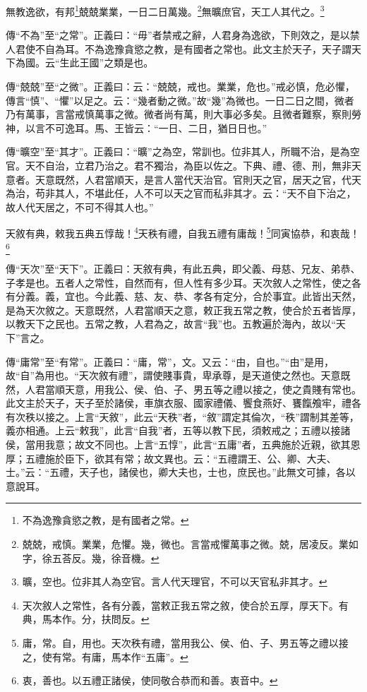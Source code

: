 無教逸欲，有邦\footnote{不為逸豫貪慾之教，是有國者之常。}兢兢業業，一日二日萬幾。\footnote{兢兢，戒慎。業業，危懼。幾，微也。言當戒懼萬事之微。兢，居凌反。業如字，徐五荅反。幾，徐音機。}無曠庶官，天工人其代之。\footnote{曠，空也。位非其人為空官。言人代天理官，不可以天官私非其才。}


{\noindent\zhuan{}\fzbyks 傳“不為”至“之常”。正義曰：“毋”者禁戒之辭，人君身為逸欲，下則效之，是以禁人君使不自為耳。不為逸豫貪慾之教，是有國者之常也。此文主於天子，天子謂天下為國。云“生此王國”之類是也。 \par}

{\noindent\zhuan{}\fzbyks 傳“兢兢”至“之微”。正義曰：云：“兢兢，戒也。業業，危也。”戒必慎，危必懼，傳言“慎”、“懼”以足之。云：“幾者動之微。”故“幾”為微也。一日二日之間，微者乃有萬事，言當戒慎萬事之微。微者尚有萬，則大事必多矣。且微者難察，察則勞神，以言不可逸耳。馬、王皆云：“一日、二日，猶日日也。” \par}

{\noindent\zhuan{}\fzbyks 傳“曠空”至“其才”。正義曰：“曠”之為空，常訓也。位非其人，所職不治，是為空官。天不自治，立君乃治之。君不獨治，為臣以佐之。下典、禮、德、刑，無非天意者。天意既然，人君當順天，是言人當代天治官。官則天之官，居天之官，代天為治，苟非其人，不堪此任，人不可以天之官而私非其才。云：“天不自下治之，故人代天居之，不可不得其人也。” \par}

天敘有典，敕我五典五惇哉！\footnote{天次敘人之常性，各有分義，當敕正我五常之敘，使合於五厚，厚天下。有典，馬本作。分，扶問反。}天秩有禮，自我五禮有庸哉！\footnote{庸，常。自，用也。天次秩有禮，當用我公、侯、伯、子、男五等之禮以接之，使有常。有庸，馬本作“五庸”。}同寅協恭，和衷哉！\footnote{衷，善也。以五禮正諸侯，使同敬合恭而和善。衷音中。}


{\noindent\zhuan{}\fzbyks 傳“天次”至“天下”。正義曰：天敘有典，有此五典，即父義、母慈、兄友、弟恭、子孝是也。五者人之常性，自然而有，但人性有多少耳。天次敘人之常性，使之各有分義。義，宜也。今此義、慈、友、恭、孝各有定分，合於事宜。此皆出天然，是為天次敘之。天意既然，人君當順天之意，敕正我五常之教，使合於五者皆厚，以教天下之民也。五常之教，人君為之，故言“我”也。五教遍於海內，故以“天下”言之。 \par}

{\noindent\zhuan{}\fzbyks 傳“庸常”至“有常”。正義曰：“庸，常”，文。又云：“由，自也。”“由”是用，故“自”為用也。“天次敘有禮”，謂使賤事貴，卑承尊，是天道使之然也。天意既然，人君當順天意，用我公、侯、伯、子、男五等之禮以接之，使之貴賤有常也。此文主於天子，天子至於諸侯，車旗衣服、國家禮儀、饗食燕好、饔餼飧牢，禮各有次秩以接之。上言“天敘”，此云“天秩”者，“敘”謂定其倫次，“秩”謂制其差等，義亦相通。上云“敕我”，此言“自我”者，五等以教下民，須敕戒之；五禮以接諸侯，當用我意；故文不同也。上言“五惇”，此言“五庸”者，五典施於近親，欲其恩厚；五禮施於臣下，欲其有常；故文異也。云：“五禮謂王、公、卿、大夫、士。”云：“五禮，天子也，諸侯也，卿大夫也，士也，庶民也。”此無文可據，各以意說耳。 \par}

